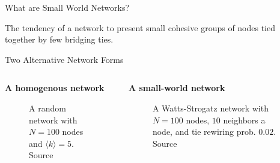 \documentclass[notes, aspectratio=1610]{beamer}
\begin{document}
\begin{frame}{What are Small World Networks?}
	\begin{tcolorbox}[
		colback=tri_2!5!white,
		colframe=tri_2!90!black,
		title={\centering \Large $\sim$ Definition 2 --- Small-world network $\sim$}]
		\large The tendency of a network to present small cohesive 
		groups of nodes tied together by few bridging ties.
	\end{tcolorbox}
\end{frame}

\begin{frame}{Two Alternative Network Forms}
	\begin{columns}[t]
		\begin{column}{0.5\textwidth}
			\begin{center}
				\textbf{A homogenous network}
				\begin{figure}
					
				\caption*{
					\footnotesize
					A random network with $N=100$ nodes 
					and $\langle k \rangle = 5$. Source 
					\cite{steger1999}
					}
				\end{figure}
			\end{center}
		\end{column}
		\begin{column}{0.5\textwidth}
			\begin{center}
				\textbf{A small-world network}
				\begin{figure}
					
				\caption*{
					\footnotesize
					A Watts-Strogatz network with $N=100$
					nodes, $10$ neighbors a node, and 
					tie rewiring prob. $0.02$. Source
					\cite{watts1998}
					}
				\end{figure}
			\end{center}
		\end{column}
	\end{columns}
\end{frame}
\end{document}
